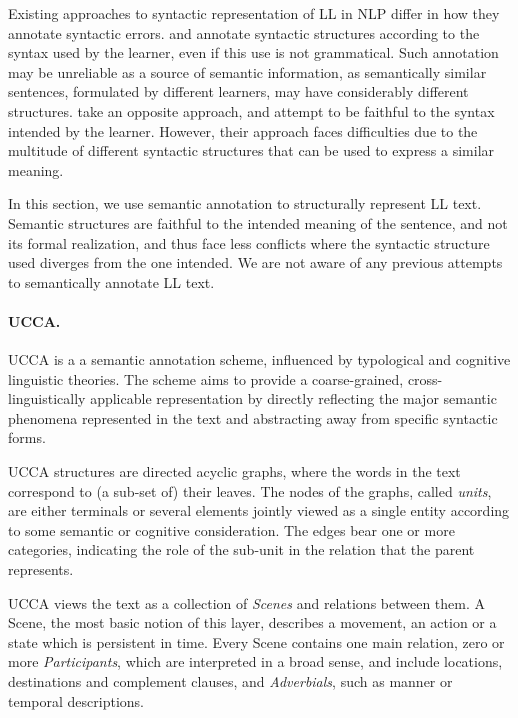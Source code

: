 \documentclass[letter,11pt]{article}
\begin{document}
Existing approaches to syntactic representation of LL in NLP
differ in how they annotate syntactic errors.
 and 
annotate syntactic structures according to the syntax used
by the learner, even if this use is not grammatical.
Such annotation may be unreliable as a source of semantic information,
as semantically similar sentences, formulated by different learners,
may have considerably different structures.  take an opposite approach, and attempt
to be faithful to the syntax intended by the learner. However, their
approach faces difficulties due to the multitude of different syntactic
structures that can be used to express a similar meaning.


In this section, we use semantic annotation to structurally
represent LL text. Semantic structures are faithful to the intended
meaning of the sentence, and not its formal realization, and thus face
less conflicts where the syntactic structure used diverges from
the one intended. We are not aware of any previous attempts to semantically
annotate LL text.


\paragraph{UCCA.}\label{sec:ucca}
UCCA is a a semantic annotation scheme, influenced
by typological and cognitive linguistic theories.
The scheme aims to provide a coarse-grained, cross-linguistically
applicable representation by directly reflecting the major semantic
phenomena represented in the text and abstracting away from
specific syntactic forms.

UCCA structures are directed acyclic graphs, where the words in the text 
correspond to (a sub-set of) their leaves.
The nodes of the graphs, called {\it units}, are either terminals or several elements jointly
viewed as a single entity according to some semantic  or cognitive consideration.
The edges bear one or more categories, indicating the role of 
the sub-unit in the relation that the parent represents.%

UCCA views the text as a collection of {\it Scenes} and relations between them.
A Scene, the most basic notion of this layer, describes a movement, 
an action or a state which is persistent in time.
Every Scene contains one main relation, 
zero or more {\it Participants}, 
which are interpreted in a broad sense, 
and include locations, destinations and complement clauses,
and {\it Adverbials}, such as manner or temporal descriptions.
\end{document}
